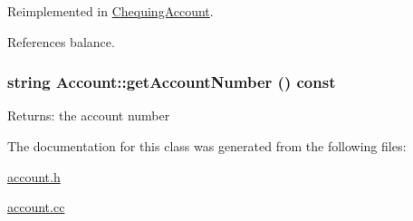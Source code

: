 Reimplemented in \hyperlink{classChequingAccount_14b54359ca8a5260b7decf0aa9bb04d2}{ChequingAccount}.

References balance.\hypertarget{classAccount_db8655dfb5f0d70eff938a414faaea31}{
\subsubsection[getAccountNumber]{\setlength{\rightskip}{0pt plus 5cm}string Account::getAccountNumber () const}}
\label{classAccount_db8655dfb5f0d70eff938a414faaea31}


\begin{Desc}
\item[Returns:]the account number \end{Desc}


The documentation for this class was generated from the following files:\begin{CompactItemize}
\item 
\hyperlink{account_8h}{account.h}\item 
\hyperlink{account_8cc}{account.cc}\end{CompactItemize}
